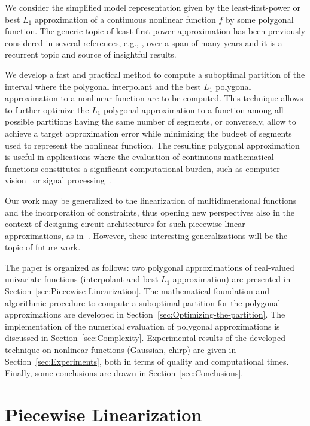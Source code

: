 \documentclass[a4paper,english]{IEEEtran}
\begin{document}
We consider the simplified model representation given by the least-first-power
or best ${L_{1}}$ approximation of a continuous nonlinear function
$f$ by some polygonal function. The generic topic of least-first-power
approximation has been previously considered in several references,
e.g., \cite{Rice1964a,Rice1964b,pinkus1989l1}, over a span of many
years and it is a recurrent topic and source of insightful results. 

We develop a fast and practical method to compute a suboptimal partition
of the interval where the polygonal interpolant and the best ${L_{1}}$
polygonal approximation to a nonlinear function are to be computed.
This technique allows to further optimize the ${L_{1}}$ polygonal approximation
to a function among all possible partitions having the same number
of segments, or conversely, allow to achieve a target approximation
error while minimizing the budget of segments used to represent the
nonlinear function. The resulting polygonal approximation is useful
in applications where the evaluation of continuous mathematical functions
constitutes a significant computational burden, such as computer vision~\cite{gallego2008segmentation,guillaumin2012face}
or signal processing~\cite{Xie2012,Sehili2012,Gallego2013TSP}.

Our work may be generalized to the linearization of multidimensional
functions~\cite{Julian1999} and the incorporation of constraints,
thus opening new perspectives also in the context of designing circuit
architectures for such piecewise linear approximations, as in~\cite{Brox2013}.
However, these interesting generalizations will be the topic of future
work.

The paper is organized as follows: two polygonal approximations of
real-valued univariate functions (interpolant and best ${L_{1}}$ approximation)
are presented in Section~\ref{sec:Piecewise-Linearization}. The
mathematical foundation and algorithmic procedure to compute a suboptimal
partition for the polygonal approximations are developed in Section~\ref{sec:Optimizing-the-partition}.
The implementation of the numerical evaluation of polygonal approximations
is discussed in Section~\ref{sec:Complexity}. Experimental results
of the developed technique on nonlinear functions (Gaussian, chirp)
are given in Section~\ref{sec:Experiments}, both in terms of quality
and computational times. Finally, some conclusions are drawn in Section~\ref{sec:Conclusions}.

\section{Piecewise Linearization\label{sec:Piecewise-Linearization}}
\end{document}
